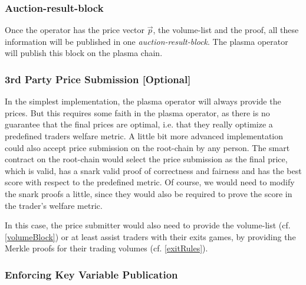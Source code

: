 \documentclass[11pt,parskip=full]{scrartcl}%
\begin{document}
\subsubsection*{Auction-result-block}

Once the operator has the price vector $\vec{p}$, the volume-list and the proof, all these information will be published in one \emph{auction-result-block}. The plasma operator will publish this block on the plasma chain. 


\subsubsection*{3rd Party Price Submission [Optional]}
\label{publicPrices}
In the simplest implementation, the plasma operator will always provide the prices. But this requires some faith in the plasma operator, as there is no guarantee that the final prices are optimal, i.e. that they really optimize a predefined traders welfare metric.
A little bit more advanced implementation could also accept price submission on the root-chain by any person. 
The smart contract on the root-chain would select the price submission as the final price, which is valid, has a snark valid proof of correctness and fairness and has the best score with respect to the predefined metric. Of course, we would need to modify the snark proofs a little, since they would also be required to prove the score in the trader's welfare metric. 

In this case, the price submitter would also need to provide the volume-list (cf. \ref{volumeBlock}) or at least assist traders with their exits games, by providing the Merkle proofs for their trading volumes (cf. \ref{exitRules}). 


\subsubsection{Enforcing Key Variable Publication}
\end{document}
